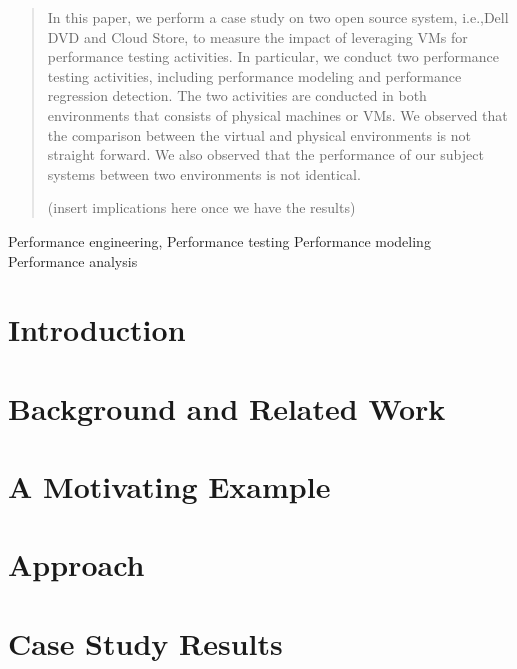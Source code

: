 \documentclass[review]{elsarticle}
\begin{document}
\begin{frontmatter}
\begin{abstract}
			In this paper, we perform a case study on two open source system, i.e.,Dell DVD and Cloud Store, to measure the impact of leveraging VMs for performance testing activities. In particular, we conduct two performance testing activities, including performance modeling and performance regression detection. The two activities are conducted in both environments that consists of physical machines or VMs. We observed that the comparison between the virtual and physical environments is not straight forward. We also observed that the performance of our subject systems between two environments is not identical.
			
			(insert implications here once we have the results)
			
		\end{abstract}
		
		\begin{keyword}
			Performance engineering, 
			Performance testing
			Performance modeling
			Performance analysis            
		\end{keyword}
		
	\end{frontmatter}
	
	
	
	 \section{Introduction}
	 \label{sec:introduction}
	 
	
	 \section{Background and Related Work}
	 \label{sec:related_work}
	 
	
	 \section{A Motivating Example}
	 \label{sec:a_motivating_example}
	 
	
	 \section{Approach}
	 \label{sec:approach}
	 
	
	 \section{Case Study Results}
	 \label{sec:results}
	 
	
\end{document}
